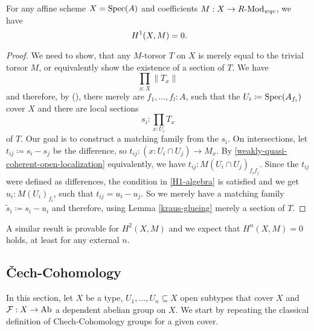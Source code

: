 \begin{theorem}%
  \label{H1-fp-module-affine-trivial}
  For any affine scheme $X=\operatorname{Spec}(A)$ and coefficients $M: X\to R\text{-}\mathrm{Mod}_{wqc}$, we have
  \[ H^1(X,M)=0 \rlap{.} \]
\end{theorem}
\begin{proof}
  We need to show, that any $M$-torsor $T$ on $X$ is merely equal to the trivial torsor $M$,
  or equivalently show the existence of a section of $T$.
  We have
  \[ \prod_{x:X}\| T_x \|\]
  and therefore, by (),
  there merely are $f_1,\dots,f_l:A$,
  such that the $U_i\coloneqq \operatorname{Spec}(A_{f_i})$ cover $X$ and
  there are local sections
  \[ s_i:\prod_{x:U_i}T_x\]
  of $T$. Our goal is to construct a matching family from the $s_i$.
  On intersections, let $t_{ij}\coloneqq s_i-s_j$ be the difference, so $t_{ij}:(x : U_i\cap U_j) \to M_x$.
  By \cref{weakly-quasi-coherent-open-localization} equivalently,
  we have $t_{ij}:M(U_{i}\cap U_j)_{f_i f_j}$.
  Since the $t_{ij}$ were defined as differences,
  the condition in \cref{H1-algebra} is satisfied and we get
  $u_i:M(U_i)_{f_i}$, such that $t_{ij}=u_i-u_j$.
  So we merely have a matching family $\tilde{s}_i\coloneqq s_i-u_i$ and therefore, using Lemma \ref{kraus-glueing} merely a section of $T$.
\end{proof}

A similar result is provable for $H^2(X,M)$ and we expect that $H^n(X,M)=0$ holds, at least for any external $n$.

\subsection{Čech-Cohomology}

In this section, let $X$ be a type, $U_1,\dots,U_n\subseteq X$ open subtypes that cover $X$
and $\mathcal F:X\to \operatorname{Ab}$ a dependent abelian group on $X$.
We start by repeating the classical definition of Chech-Cohomology groups for a given cover.

